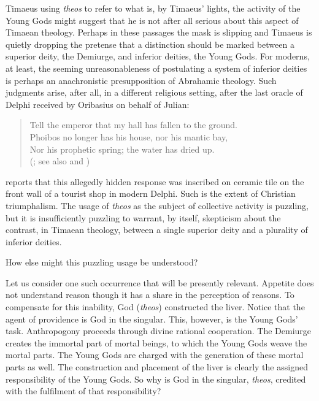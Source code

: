 Timaeus using \emph{theos} to refer to what is, by Timaeus' lights, the activity of the Young Gods might suggest that he is not after all serious about this aspect of Timaean theology. Perhaps in these passages the mask is slipping and Timaeus is quietly dropping the pretense that a distinction should be marked between a superior deity, the Demiurge, and inferior deities, the Young Gods. For moderns, at least, the seeming unreasonableness of postulating a system of inferior deities is perhaps an anachronistic presupposition of Abrahamic theology. Such judgments arise, after all, in a different religious setting, after the last oracle of Delphi received by Oribasius on behalf of Julian:
\begin{verse}
	Tell the emperor that my hall has fallen to the ground.\\
	Phoibos no longer has his house, nor his mantic bay,\\
	Nor his prophetic spring; the water has dried up.\\
	(\citealt[353]{Fontenrose:1978aa}; see also \citealt[289--91]{Parke:1956aa} and \citealt[194--5]{Parke:1956ab})
\end{verse}
\citet[355 n2]{Gregory:1983aa} reports that this allegedly hidden response was inscribed on ceramic tile on the front wall of a tourist shop in modern Delphi. Such is the extent of Christian triumphalism. The usage of \emph{theos} as the subject of collective activity is puzzling, but it is insufficiently puzzling to warrant, by itself, skepticism about the contrast, in Timaean theology, between a single superior deity and a plurality of inferior deities.

How else might this puzzling usage be understood?

Let us consider one such occurrence that will be presently relevant. Appetite does not understand reason though it has a share in the perception of reasons. To compensate for this inability, God (\emph{theos}) constructed the liver. Notice that the agent of providence is God in the singular. This, however, is the Young Gods' task. Anthropogony proceeds through divine rational cooperation. The Demiurge creates the immortal part of mortal beings, to which the Young Gods weave the mortal parts. The Young Gods are charged with the generation of these mortal parts as well. The construction and placement of the liver is clearly the assigned responsibility of the Young Gods. So why is God in the singular, \emph{theos}, credited with the fulfilment of that responsibility? 

